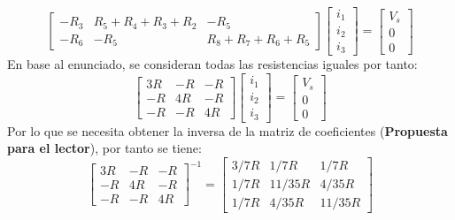 \documentclass[
  11pt,
  letterpaper,
   addpoints,
  ]{exam}
\begin{document}
\begin{solution}
\begin{enumerate}
\begin{equation}
\begin{bmatrix}
            -R_3 & R_5 + R_4 + R_3 + R_2 & -R_5 \\
            -R_6 & -R_5 & R_8 + R_7 + R_6 + R_5
        \end{bmatrix}
        \begin{bmatrix}
            i_1 \\
            i_2 \\
            i_3
        \end{bmatrix}
        =
        \begin{bmatrix}
            V_s \\
            0 \\
            0
        \end{bmatrix}
    \end{equation}
    En base al enunciado, se consideran todas las resistencias iguales por tanto:
    \begin{equation}
        \begin{bmatrix}
            3R & -R & -R \\
            -R & 4R & -R \\
            -R & -R & 4R
        \end{bmatrix}
        \begin{bmatrix}
            i_1 \\
            i_2 \\
            i_3
        \end{bmatrix}
        =
        \begin{bmatrix}
            V_s \\
            0 \\
            0
        \end{bmatrix}
    \end{equation}
    Por lo que se necesita obtener la inversa de la matriz de coeficientes (\textbf{Propuesta para el lector}), por tanto se tiene:
    \begin{equation}
        \begin{bmatrix}
            3R & -R & -R \\
            -R & 4R & -R \\
            -R & -R & 4R
        \end{bmatrix}^{-1}
        =
        \begin{bmatrix}
            3/7R & 1/7R & 1/7R \\
            1/7R & 11/35R & 4/35R \\
            1/7R & 4/35R & 11/35R
        \end{bmatrix}

\end{equation}
\end{enumerate}
\end{solution}
\end{document}
